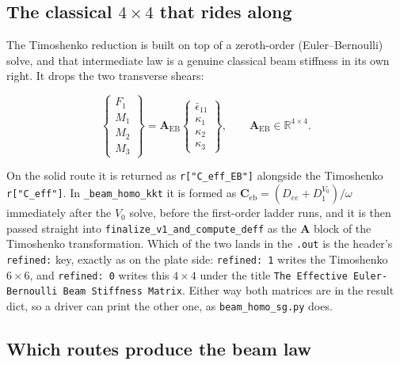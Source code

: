 \subsection{The classical $4\times4$ that rides along}
\label{sec:ceffeb}

The Timoshenko reduction is built on top of a zeroth-order (Euler--Bernoulli)
solve, and that intermediate law is a genuine classical beam stiffness in its
own right. It drops the two transverse shears:

\begin{equation}
\begin{Bmatrix} F_1 \\ M_1 \\ M_2 \\ M_3 \end{Bmatrix}
=
\mathbf A_{\mathrm{EB}}
\begin{Bmatrix} \bar\epsilon_{11} \\ \kappa_1 \\ \kappa_2 \\ \kappa_3 \end{Bmatrix},
\qquad \mathbf A_{\mathrm{EB}} \in \mathbb R^{4\times4}.
\end{equation}

On the solid route it is returned as \texttt{r["C\_eff\_EB"]} alongside the
Timoshenko \texttt{r["C\_eff"]}. In \texttt{\_beam\_homo\_kkt} it is formed as
$\mathbf C_{\mathrm{eb}} = (D_{ee} + D_1^{V_0})/\omega$ immediately after the
$V_0$ solve, before the first-order ladder runs, and it is then passed straight
into \texttt{finalize\_v1\_and\_compute\_deff} as the $\mathbf A$ block of the
Timoshenko transformation. Which of the two lands in the \texttt{.out} is the
header's \texttt{refined:} key, exactly as on the plate side:
\texttt{refined: 1} writes the Timoshenko $6\times6$, and \texttt{refined: 0}
writes this $4\times4$ under the title
\texttt{The Effective Euler-Bernoulli Beam Stiffness Matrix}. Either way both
matrices are in the result dict, so a driver can print the other one, as
\texttt{beam\_homo\_sg.py} does.

\subsection{Which routes produce the beam law}

